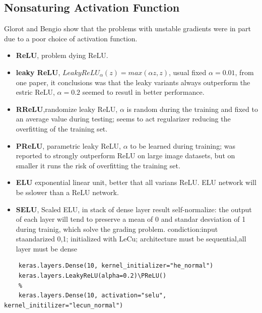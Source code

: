 \documentclass[12pt, a4paper]{book}
\begin{document}
\subsection*{Nonsaturing Activation Function}
Glorot and Bengio show that the problems with unstable gradients were in part due to a poor choice of activation function.
\begin{itemize}
	\item \textbf{ReLU}, problem dying ReLU.
	\item \textbf{leaky ReLU}, $LeakyReLU_{\alpha}(z)=max(\alpha z,z)$, usual fixed $\alpha =0.01$, from one paper, it conclusions was that the leaky variants always outperform the estric ReLU, $\alpha =0.2$ seemed to resutl in better performance. 
	\item \textbf{RReLU},randomize leaky ReLU, $\alpha$ is random during the training and fixed to an average value during testing; seems to act regularizer reducing the overfitting of the training set.
	\item \textbf{PReLU}, parametric leaky ReLU, $\alpha$ to be learned during training; was reported to strongly outperform ReLU on large image datasets, but on smaller it runs the risk of overfitting the training set.
	\item \textbf{ELU} exponential linear unit, better that all varians ReLU. ELU network will be sslower than a ReLU network.
	\item \textbf{SELU}, Scaled ELU, in stack of dense layer result self-normalize: the output of each layer will tend to preserve a mean of 0 and standar desviation of 1 during trainig, which solve the grading problem. condiction:input staandarized 0,1; initialized with LeCu; architecture must be sequential,all layer must be dense
\end{itemize}
\begin{verbatim}
	keras.layers.Dense(10, kernel_initializer="he_normal")
	keras.layers.LeakyReLU(alpha=0.2)\PReLU()
	%
	keras.layers.Dense(10, activation="selu", kernel_initilizer="lecun_normal")
	
\end{verbatim}
\end{document}
